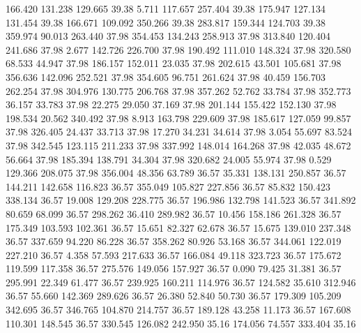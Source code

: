  166.420  131.238  129.665        39.38
   5.711  117.657  257.404        39.38
 175.947  127.134  131.454        39.38
 166.671  109.092  350.266        39.38
 283.817  159.344  124.703        39.38
 359.974   90.013  263.440        37.98
 354.453  134.243  258.913        37.98
 313.840  120.404  241.686        37.98
   2.677  142.726  226.700        37.98
 190.492  111.010  148.324        37.98
 320.580   68.533   44.947        37.98
 186.157  152.011   23.035        37.98
 202.615   43.501  105.681        37.98
 356.636  142.096  252.521        37.98
 354.605   96.751  261.624        37.98
  40.459  156.703  262.254        37.98
 304.976  130.775  206.768        37.98
 357.262   52.762   33.784        37.98
 352.773   36.157   33.783        37.98
  22.275   29.050   37.169        37.98
 201.144  155.422  152.130        37.98
 198.534   20.562  340.492        37.98
   8.913  163.798  229.609        37.98
 185.617  127.059   99.857        37.98
 326.405   24.437   33.713        37.98
  17.270   34.231   34.614        37.98
   3.054   55.697   83.524        37.98
 342.545  123.115  211.233        37.98
 337.992  148.014  164.268        37.98
  42.035   48.672   56.664        37.98
 185.394  138.791   34.304        37.98
 320.682   24.005   55.974        37.98
   0.529  129.366  208.075        37.98
 356.004   48.356   63.789        36.57
  35.331  138.131  250.857        36.57
 144.211  142.658  116.823        36.57
 355.049  105.827  227.856        36.57
  85.832  150.423  338.134        36.57
  19.008  129.208  228.775        36.57
 196.986  132.798  141.523        36.57
 341.892   80.659   68.099        36.57
 298.262   36.410  289.982        36.57
  10.456  158.186  261.328        36.57
 175.349  103.593  102.361        36.57
  15.651   82.327   62.678        36.57
  15.675  139.010  237.348        36.57
 337.659   94.220   86.228        36.57
 358.262   80.926   53.168        36.57
 344.061  122.019  227.210        36.57
   4.358   57.593  217.633        36.57
 166.084   49.118  323.723        36.57
 175.672  119.599  117.358        36.57
 275.576  149.056  157.927        36.57
   0.090   79.425   31.381        36.57
 295.991   22.349   61.477        36.57
 239.925  160.211  114.976        36.57
 124.582   35.610  312.946        36.57
  55.660  142.369  289.626        36.57
  26.380   52.840   50.730        36.57
 179.309  105.209  342.695        36.57
 346.765  104.870  214.757        36.57
 189.128   43.258   11.173        36.57
 167.608  110.301  148.545        36.57
 330.545  126.082  242.950        35.16
 174.056   74.557  333.404        35.16
